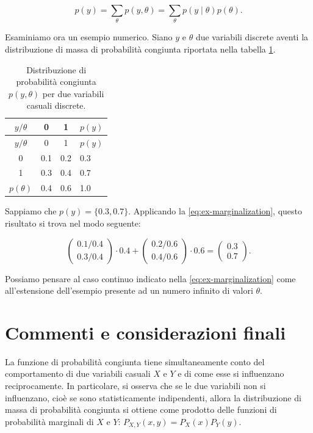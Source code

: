 \documentclass[
  11pt,
]{krantz}
\theoremstyle{definition}
\theoremstyle{definition}
\theoremstyle{definition}
\theoremstyle{definition}
\theoremstyle{remark}
\begin{document}
\begin{equation}
p(y) = \sum_{\theta} p(y, \theta) = \sum_{\theta} p(y \mid \theta) p(\theta).
\label{eq:ex-marginalization}
\end{equation}

Esaminiamo ora un esempio numerico. Siano \(y\) e \(\theta\) due variabili discrete aventi la distribuzione di massa di probabilità congiunta riportata nella tabella \ref{tab:ex-marg}.

\begin{longtable}[]{@{}cccl@{}}
\caption{\label{tab:ex-marg} Distribuzione di probabilità congiunta \(p(y, \theta)\) per due variabili casuali discrete.}\tabularnewline
\toprule
\(y / \theta\) & 0 & 1 & \(p(y)\) \\
\midrule
\endfirsthead
\toprule
\(y / \theta\) & 0 & 1 & \(p(y)\) \\
\midrule
\endhead
0 & 0.1 & 0.2 & 0.3 \\
1 & 0.3 & 0.4 & 0.7 \\
\(p(\theta)\) & 0.4 & 0.6 & 1.0 \\
\bottomrule
\end{longtable}

Sappiamo che \(p(y) = \{0.3, 0.7\}\). Applicando la \eqref{eq:ex-marginalization}, questo risultato si trova nel modo seguente:

\[
\begin{pmatrix}
    0.1 / 0.4 \\
    0.3 / 0.4
\end{pmatrix} \cdot 0.4 +
\begin{pmatrix}
    0.2 / 0.6 \\
    0.4 / 0.6
\end{pmatrix} \cdot 0.6 =
\begin{pmatrix}
    0.3 \\
   0.7
\end{pmatrix}.
\]

Possiamo pensare al caso continuo indicato nella \eqref{eq:ex-marginalization} come all'estensione dell'esempio presente ad un numero infinito di valori \(\theta\).

\hypertarget{commenti-e-considerazioni-finali-3}{%
\section*{Commenti e considerazioni finali}\label{commenti-e-considerazioni-finali-3}}


La funzione di probabilità congiunta tiene simultaneamente conto del comportamento di due variabili casuali \(X\) e \(Y\) e di come esse si influenzano reciprocamente. In particolare, si osserva che se le due variabili non si influenzano, cioè se sono statisticamente indipendenti, allora la distribuzione di massa di probabilità congiunta si ottiene come prodotto delle funzioni di probabilità marginali di \(X\) e \(Y\): \(P_{X, Y}(x, y) = P_X(x) P_Y(y)\).
\end{document}
